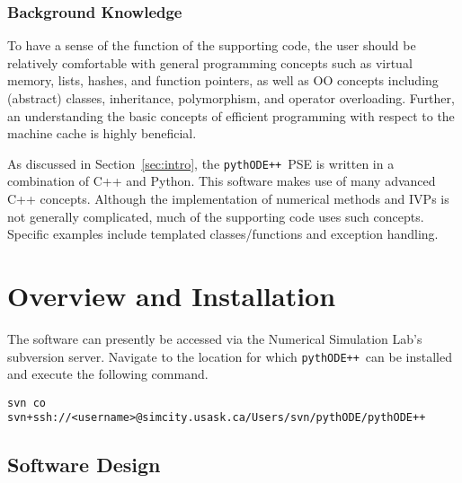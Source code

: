 \documentclass[11pt]{article}
\newcommand{\pypp}{\texttt{pythODE++}}
\begin{document}
\subsubsection{Background Knowledge}

To have a sense of the function of the supporting code, the user
should be relatively comfortable with general programming concepts
such as virtual memory, lists, hashes, and function pointers, as well
as \ac{OO} concepts including (abstract) classes, inheritance,
polymorphism, and operator overloading.  Further, an understanding the
basic concepts of efficient programming with respect to the machine
cache is highly beneficial.

As discussed in Section~\ref{sec:intro}, the \pypp\ \ac{PSE} is written in a combination of C++ and Python.
This software makes use of many advanced C++ concepts.
Although the implementation of numerical methods and \acp{IVP} is not generally complicated, much of the supporting code uses such concepts.
Specific examples include templated classes/functions and exception handling.

\section{Overview and Installation}

The software can presently be accessed via the Numerical Simulation Lab's subversion server. Navigate to the location for which \pypp\ can be installed and execute the following command.
\begin{verbatim}
svn co svn+ssh://<username>@simcity.usask.ca/Users/svn/pythODE/pythODE++
\end{verbatim}

\subsection{Software Design}
\end{document}
